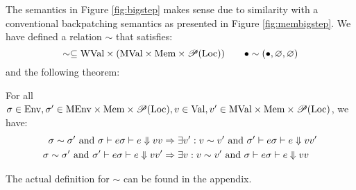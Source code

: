 The semantics in Figure \ref{fig:bigstep} makes sense due to similarity with a conventional backpatching semantics as presented in Figure \ref{fig:membigstep}.
We have defined a relation $\sim$ that satisfies:
\[\sim\subseteq\text{WVal}\times(\text{MVal}\times\text{Mem}\times\mathscr{P}(\text{Loc}))\qquad\bullet\sim(\bullet,\varnothing,\varnothing)\]
and the following theorem:
\begin{theorem}\normalfont
  For all $\sigma\in\text{Env},\sigma'\in\text{MEnv}\times\text{Mem}\times\mathscr{P}(\text{Loc}),v\in\text{Val},v'\in\text{MVal}\times\text{Mem}\times\mathscr{P}(\text{Loc})$, we have:
  \begin{align*}
    \sigma\sim\sigma'\text{ and }\sigma\vdash e{\sigma}\vdash{e}\Downarrow{v} v   & \Rightarrow\exists v':v\sim v'\text{ and }\sigma'\vdash e{\sigma}\vdash{e}\Downarrow{v} v' \\
    \sigma\sim\sigma'\text{ and }\sigma'\vdash e{\sigma}\vdash{e}\Downarrow{v} v' & \Rightarrow\exists v:v\sim v'\text{ and }\sigma\vdash e{\sigma}\vdash{e}\Downarrow{v} v
  \end{align*}
\end{theorem}
The actual definition for $\sim$ can be found in the appendix.
